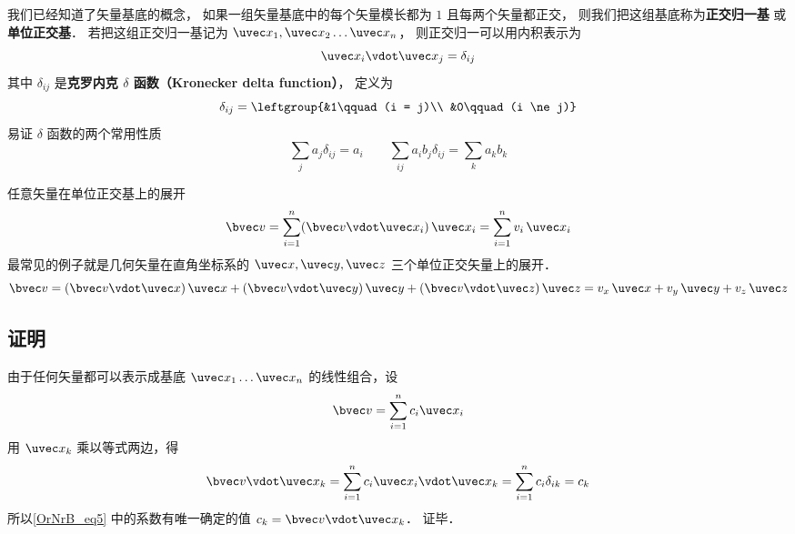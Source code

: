

我们已经知道了矢量基底的概念， 如果一组矢量基底中的每个矢量模长都为 $1$ 且每两个矢量都正交， 则我们把这组基底称为\textbf{正交归一基} 或\textbf{单位正交基}． 若把这组正交归一基记为 $\uvec x_1,\uvec x_2\dots\uvec x_n$， 则正交归一可以用内积表示为
\begin{equation}
\uvec x_i \vdot \uvec x_j = \delta_{ij}
\end{equation}
其中 $\delta_{ij}$ 是\textbf{克罗内克 $\delta$ 函数（Kronecker delta function）}， 定义为
\begin{equation}\label{OrNrB_eq2}
\delta_{ij} = \leftgroup{&1\qquad (i = j)\\ &0\qquad (i \ne j)}
\end{equation}
易证 $\delta$ 函数的两个常用性质
\begin{equation}
\sum_j a_j \delta_{ij} = a_i
\qquad
\sum_{ij} a_i b_j \delta_{ij} = \sum_k a_k b_k
\end{equation}

任意矢量在单位正交基上的展开
 \begin{equation}
\bvec v = \sum_{i = 1}^n (\bvec v\vdot\uvec x_i)\,\uvec x_i = \sum_{i = 1}^n v_i \,\uvec x_i
\end{equation}
最常见的例子就是几何矢量在直角坐标系的 $\uvec x, \uvec y, \uvec z$ 三个单位正交矢量上的展开．
 \begin{equation}
\bvec v = (\bvec v \vdot \uvec x)\,\uvec x + (\bvec v \vdot \uvec y)\,\uvec y + (\bvec v \vdot \uvec z)\,\uvec z = v_x \,\uvec x + v_y \,\uvec y + v_z \,\uvec z
\end{equation} 

\subsection{证明}
由于任何矢量都可以表示成基底 $\uvec x_1 \dots \uvec x_n$ 的线性组合，设
\begin{equation}\label{OrNrB_eq5}
\bvec v = \sum_{i = 1}^n c_i \uvec x_i
\end{equation} 
用 $\uvec x_k$ 乘以等式两边，得
\begin{equation}
\bvec v \vdot \uvec x_k = \sum_{i = 1}^n  c_i \uvec x_i \vdot\uvec x_k = \sum_{i = 1}^n c_i \delta_{ik}  = c_k
\end{equation}
所以\autoref{OrNrB_eq5} 中的系数有唯一确定的值 $c_k = \bvec v \vdot\uvec x_k$． 证毕．
